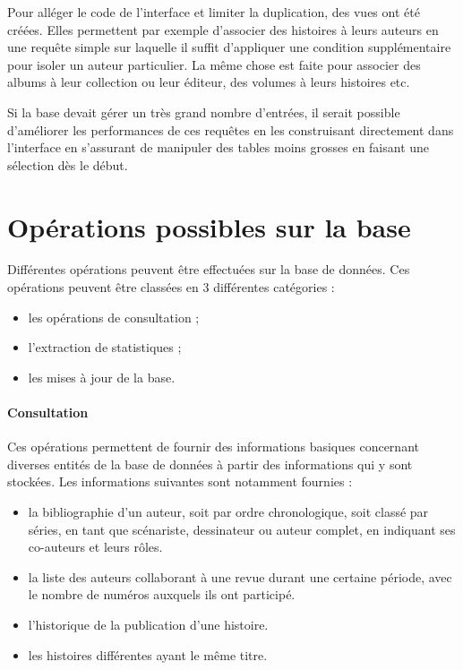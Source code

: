 \documentclass[12pt]{article}
\begin{document}
Pour alléger le code de l'interface et limiter la duplication, des vues ont été créées. Elles permettent
par exemple d'associer des histoires à leurs auteurs en une requête simple sur
laquelle il suffit d'appliquer une condition supplémentaire pour isoler un
auteur particulier. La même chose est faite pour associer des albums à leur
collection ou leur éditeur, des volumes à leurs histoires etc.

Si la base devait gérer un très grand nombre d'entrées, il serait possible
d'améliorer les performances de ces requêtes en les construisant directement
dans l'interface en s'assurant de manipuler des tables moins grosses en
faisant une sélection dès le début.


\section{Opérations possibles sur la base}

Différentes opérations peuvent être effectuées sur la base de données.
Ces opérations peuvent être classées en 3 différentes catégories :
\begin{itemize}
	\item les opérations de consultation ;
	\item l'extraction de statistiques ;
	\item les mises à jour de la base.
\end{itemize}

\paragraph{Consultation}

Ces opérations permettent de fournir des informations basiques concernant
diverses entités de la base de données à partir des informations qui y sont
stockées.
Les informations suivantes sont notamment fournies :
\begin{itemize}
	\item la bibliographie d’un auteur, soit par ordre chronologique, soit classé par séries, en tant que
		scénariste, dessinateur ou auteur complet, en indiquant ses co-auteurs et leurs rôles.
	\item la liste des auteurs collaborant à une revue durant une certaine période, avec le nombre de
		numéros auxquels ils ont participé.
	\item l'historique de la publication d’une histoire.
	\item les histoires différentes ayant le même titre.
\end{itemize}
\end{document}

